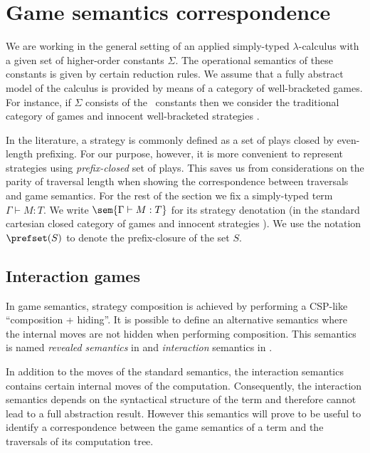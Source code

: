 






\section{Game semantics correspondence}
\label{sec:gamesemcorresp}

 We are working in the general setting of an applied
simply-typed $\lambda$-calculus with a given set of higher-order
constants $\Sigma$. The operational semantics of these constants is
given by certain reduction rules. We assume that a fully abstract
model of the calculus is provided by means of a category of
well-bracketed games. For instance, if $\Sigma$ consists
of the \pcf\ constants then we consider the traditional
category of games and innocent well-bracketed strategies
\cite{hylandong_pcf,abramsky94full}.


In the literature, a strategy is commonly defined as a set of plays closed by
even-length prefixing. For our purpose, however, it is more convenient to represent strategies using \emph{prefix-closed} set of plays. This saves us from considerations on the parity of traversal length when
showing the correspondence between traversals and game semantics.
 For the rest of the section we fix a simply-typed term $\Gamma \vdash M :T$. We write $\sem{\Gamma \vdash M : T}$ for its strategy denotation (in the standard cartesian closed category of games and innocent strategies \cite{abramsky94full, hylandong_pcf}). We use the notation $\prefset(S)$ to denote the prefix-closure of the set $S$.

\subsection{Interaction games}
\label{sec:interaction_semantics}

In game semantics, strategy composition is achieved by performing a
CSP-like ``composition + hiding''. It is possible to define an
alternative semantics where the internal moves are not hidden when
performing composition. This semantics is named \emph{revealed
semantics} in \cite{willgreenlandthesis} and \emph{interaction}
semantics in \cite{DBLP:conf/sas/DimovskiGL05}.

In addition to the moves of the standard semantics, the interaction
semantics contains certain internal moves of the computation.
Consequently, the interaction semantics depends on the syntactical
structure of the term and therefore cannot lead to a full
abstraction result. However this semantics will prove to be useful
to identify a correspondence between the game semantics of a term
and the traversals of its computation tree.

